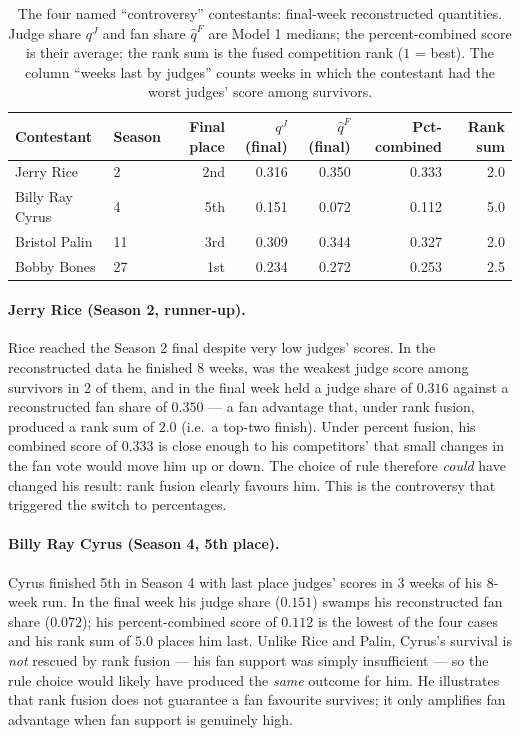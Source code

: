 \documentclass{article}
\begin{document}
\begin{table}[H]
\centering
\caption{The four named ``controversy'' contestants: final-week reconstructed quantities.
Judge share $q^J$ and fan share $\hat q^F$ are Model 1 medians; the percent-combined score
is their average; the rank sum is the fused competition rank ($1$ = best). The column
``weeks last by judges'' counts weeks in which the contestant had the worst judges' score
among survivors.}
\label{tab:controversy}
\begin{tabular}{llrrrrr}
\toprule
Contestant & Season & Final place & $q^J$ (final) & $\hat q^F$ (final) & Pct-combined & Rank sum \\
\midrule
Jerry Rice         & 2  & 2nd & 0.316 & 0.350 & 0.333 & 2.0 \\
Billy Ray Cyrus    & 4  & 5th & 0.151 & 0.072 & 0.112 & 5.0 \\
Bristol Palin      & 11 & 3rd & 0.309 & 0.344 & 0.327 & 2.0 \\
Bobby Bones        & 27 & 1st & 0.234 & 0.272 & 0.253 & 2.5 \\
\bottomrule
\end{tabular}
\end{table}

\paragraph{Jerry Rice (Season 2, runner-up).} Rice reached the Season 2 final despite very
low judges' scores. In the reconstructed data he finished 8 weeks, was the weakest judge
score among survivors in 2 of them, and in the final week held a judge share of $0.316$
against a reconstructed fan share of $0.350$ --- a fan advantage that, under rank fusion,
produced a rank sum of $2.0$ (i.e.\ a top-two finish). Under percent fusion, his combined
score of $0.333$ is close enough to his competitors' that small changes in the fan vote
would move him up or down. The choice of rule therefore \emph{could} have changed his
result: rank fusion clearly favours him. This is the controversy that triggered the switch
to percentages.

\paragraph{Billy Ray Cyrus (Season 4, 5th place).} Cyrus finished 5th in Season 4 with last
place judges' scores in 3 weeks of his 8-week run. In the final week his judge share
($0.151$) swamps his reconstructed fan share ($0.072$); his percent-combined score of
$0.112$ is the lowest of the four cases and his rank sum of $5.0$ places him last. Unlike
Rice and Palin, Cyrus's survival is \emph{not} rescued by rank fusion --- his fan support was
simply insufficient --- so the rule choice would likely have produced the \emph{same}
outcome for him. He illustrates that rank fusion does not guarantee a fan favourite survives;
it only amplifies fan advantage when fan support is genuinely high.
\end{document}
